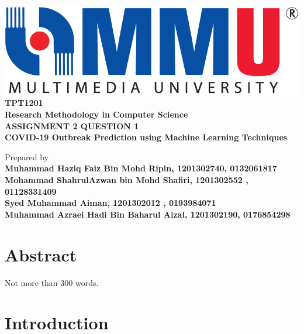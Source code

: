\documentclass[12pt,a4paper,oneside]{article}
\begin{document}
\begin{center}

\includegraphics[scale=0.30]{mmu.png}\\
\vspace{1cm}
\Large{\textbf{TPT1201 \\Research Methodology in Computer Science}} \\
\vspace{2.5cm}
\Large{\textbf{ASSIGNMENT 2 QUESTION 1}} \\
\vspace{1cm}
\Large{\textbf{COVID-19 Outbreak Prediction using Machine Learning Techniques}} \\
\vspace{1cm}
 


\vspace{3.5cm}


\normalsize{Prepared by} \\
\vspace{2.5cm}
\large{\textbf{Muhammad Haziq Faiz Bin Mohd Ripin, 1201302740, 0132061817}} \\ 
\large{\textbf{Mohammad ShahrulAzwan bin Mohd Shafiri, 1201302552 , 01128331409}} \\ 
\large{\textbf{Syed Muhammad Aiman, 1201302012 , 0193984071}} \\
\large{\textbf{Muhammad Azraei Hadi Bin Baharul Aizal, 1201302190, 0176854298}} \\ 
\end{center}

\thispagestyle{empty}
 
\clearpage 


\section{Abstract}

Not more than 300 words.

\section{Introduction}
\end{document}
